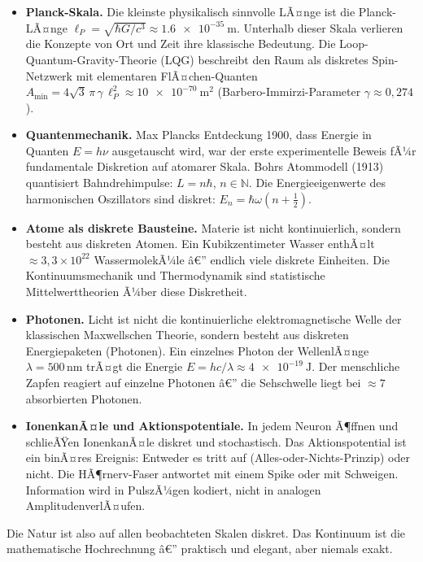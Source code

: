 ﻿\documentclass[12pt,a4paper,titlepage]{report}
\begin{document}
\begin{itemize}[leftmargin=2em]
	\item \textbf{Planck-Skala.}
		Die kleinste physikalisch sinnvolle LÃ¤nge ist die Planck-LÃ¤nge
		$\ell_P = \sqrt{\hbar G / c^3} \approx \SI{1.6e-35}{\metre}$.
		Unterhalb dieser Skala verlieren die Konzepte von Ort und Zeit
		ihre klassische Bedeutung.
		Die Loop-Quantum-Gravity-Theorie (LQG) beschreibt den Raum
		als diskretes Spin-Netzwerk mit elementaren FlÃ¤chen-Quanten
		$A_{\min} = 4\sqrt{3}\,\pi\,\gamma\,\ell_P^2 \approx
		\SI{10e-70}{\metre\squared}$ (Barbero-Immirzi-Parameter $\gamma\approx0{,}274$).
	\item \textbf{Quantenmechanik.}
		Max Plancks Entdeckung 1900, dass Energie in Quanten
		$E = h\nu$ ausgetauscht wird, war der erste experimentelle Beweis
		fÃ¼r fundamentale Diskretion auf atomarer Skala.
		Bohrs Atommodell (1913) quantisiert Bahndrehimpulse:
		$L = n\hbar$, $n \in \mathbb{N}$.
		Die Energieeigenwerte des harmonischen Oszillators sind diskret:
		$E_n = \hbar\omega(n + \tfrac{1}{2})$.
	\item \textbf{Atome als diskrete Bausteine.}
		Materie ist nicht kontinuierlich, sondern besteht aus diskreten
		Atomen.
		Ein Kubikzentimeter Wasser enthÃ¤lt $\approx 3{,}3\times10^{22}$
		WassermolekÃ¼le â€” endlich viele diskrete Einheiten.
		Die Kontinuumsmechanik und Thermodynamik sind statistische
		Mittelwerttheorien Ã¼ber diese Diskretheit.
	\item \textbf{Photonen.}
		Licht ist nicht die kontinuierliche elektromagnetische Welle
		der klassischen Maxwellschen Theorie, sondern besteht aus
		diskreten Energiepaketen (Photonen).
		Ein einzelnes Photon der WellenlÃ¤nge $\lambda=500\,\mathrm{nm}$
		trÃ¤gt die Energie $E = hc/\lambda \approx \SI{4e-19}{\joule}$.
		Der menschliche Zapfen reagiert auf einzelne Photonen â€”
		die Sehschwelle liegt bei $\approx 7$ absorbierten Photonen.
	\item \textbf{IonenkanÃ¤le und Aktionspotentiale.}
		In jedem Neuron Ã¶ffnen und schlieÃŸen IonenkanÃ¤le diskret
		und stochastisch.
		Das Aktionspotential ist ein binÃ¤res Ereignis: Entweder es
		tritt auf (Alles-oder-Nichts-Prinzip) oder nicht.
		Die HÃ¶rnerv-Faser antwortet mit einem Spike oder mit Schweigen.
		Information wird in PulszÃ¼gen kodiert, nicht in analogen
		AmplitudenverlÃ¤ufen.
\end{itemize}

Die Natur ist also auf allen beobachteten Skalen diskret.
Das Kontinuum ist die mathematische Hochrechnung â€”
praktisch und elegant, aber niemals exakt.
\end{document}
